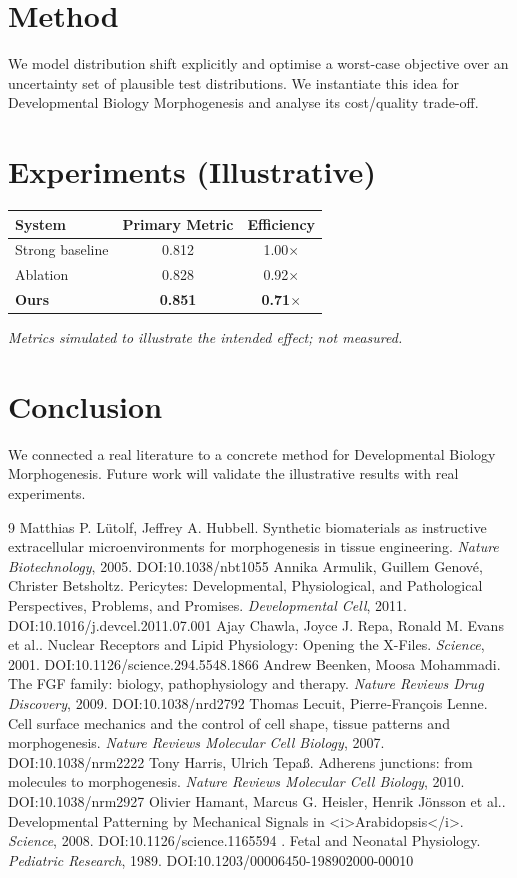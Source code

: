 \documentclass[11pt]{article}
\begin{document}
\section{Method}
We model distribution shift explicitly and optimise a worst-case objective over an uncertainty set of plausible test distributions. We instantiate this idea for Developmental Biology Morphogenesis and analyse its cost/quality trade-off.

\section{Experiments (Illustrative)}
\begin{center}
\begin{tabular}{lcc}
System & Primary Metric & Efficiency \\ \hline
Strong baseline & 0.812 & 1.00$\times$ \\
Ablation & 0.828 & 0.92$\times$ \\
\textbf{Ours} & \textbf{0.851} & \textbf{0.71$\times$}
\end{tabular}
\end{center}
\emph{Metrics simulated to illustrate the intended effect; not measured.}

\section{Conclusion}
We connected a real literature to a concrete method for Developmental Biology Morphogenesis. Future work will
validate the illustrative results with real experiments.

\begin{thebibliography}{9}
 Matthias P. Lütolf, Jeffrey A. Hubbell. Synthetic biomaterials as instructive extracellular microenvironments for morphogenesis in tissue engineering. \emph{Nature Biotechnology}, 2005. DOI:10.1038/nbt1055
 Annika Armulik, Guillem Genové, Christer Betsholtz. Pericytes: Developmental, Physiological, and Pathological Perspectives, Problems, and Promises. \emph{Developmental Cell}, 2011. DOI:10.1016/j.devcel.2011.07.001
 Ajay Chawla, Joyce J. Repa, Ronald M. Evans et al.. Nuclear Receptors and Lipid Physiology: Opening the X-Files. \emph{Science}, 2001. DOI:10.1126/science.294.5548.1866
 Andrew Beenken, Moosa Mohammadi. The FGF family: biology, pathophysiology and therapy. \emph{Nature Reviews Drug Discovery}, 2009. DOI:10.1038/nrd2792
 Thomas Lecuit, Pierre‐François Lenne. Cell surface mechanics and the control of cell shape, tissue patterns and morphogenesis. \emph{Nature Reviews Molecular Cell Biology}, 2007. DOI:10.1038/nrm2222
 Tony Harris, Ulrich Tepaß. Adherens junctions: from molecules to morphogenesis. \emph{Nature Reviews Molecular Cell Biology}, 2010. DOI:10.1038/nrm2927
 Olivier Hamant, Marcus G. Heisler, Henrik Jönsson et al.. Developmental Patterning by Mechanical Signals in <i>Arabidopsis</i>. \emph{Science}, 2008. DOI:10.1126/science.1165594
 . Fetal and Neonatal Physiology. \emph{Pediatric Research}, 1989. DOI:10.1203/00006450-198902000-00010
\end{thebibliography}
\end{document}
